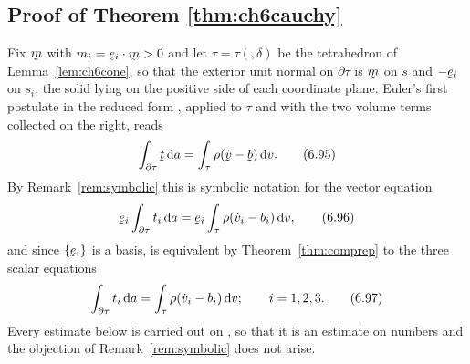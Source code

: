 \subsection*{Proof of Theorem \ref{thm:ch6cauchy}}

Fix $\bm$ with $m_{i}=\ip{\be_{i}}\bm>0$ and let $\tau=\tau(\bm,\delta)$
be the tetrahedron of Lemma~\ref{lem:ch6cone}, so that the exterior unit
normal on $\partial\tau$ is $\bm$ on $s$ and $-\be_{i}$ on $s_{i}$, the
solid lying on the positive side of each coordinate plane. Euler's first
postulate in the reduced form , applied to $\tau$ and with the
two volume terms collected on the right, reads
\begin{equation}
   \int_{\partial\tau}\bt\,\dl a=\int_{\tau}\rho(\dot\bv-\bb)\,\dl v .
   \tag{6.95}\label{eq:6.95}
\end{equation}
By Remark~\ref{rem:symbolic} this is symbolic notation for the vector
equation
\begin{equation}
   \be_{i}\int_{\partial\tau}t_{i}\,\dl a
   =\be_{i}\int_{\tau}\rho(\dot v_{i}-b_{i})\,\dl v ,
   \tag{6.96}\label{eq:6.96}
\end{equation}
and since $\{\be_{i}\}$ is a basis,  is equivalent by
Theorem~\ref{thm:comprep} to the three scalar equations
\begin{equation}
   \int_{\partial\tau}t_{i}\,\mathrm{d} a
   =\int_{\tau}\rho(\dot v_{i}-b_{i})\,\mathrm{d} v ;\qquad i=1,2,3 .
   \tag{6.97}\label{eq:6.97}
\end{equation}
Every estimate below is carried out on , so that it is an
estimate on numbers and the objection of Remark~\ref{rem:symbolic} does
not arise.

